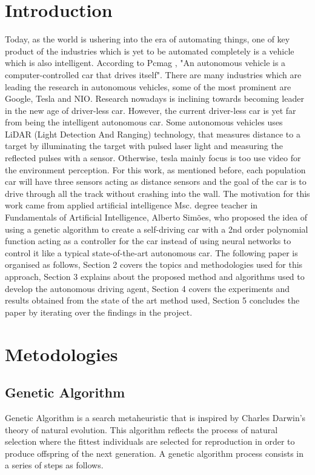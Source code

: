 \documentclass[conference]{IEEEtran}
\begin{document}
\section{Introduction}
Today, as the world is ushering into the era of automating things, one of key product of the industries which is yet
to be automated completely is a vehicle which is also intelligent. According to Pcmag \cite{pcmag_unknown}, "An autonomous vehicle is a
computer-controlled car that drives itself". There are many industries which are leading the research in autonomous
vehicles, some of the most prominent are Google, Tesla and NIO. Research nowadays is inclining towards becoming leader
in the new age of driver-less car. However, the current driver-less car is yet far from being the intelligent autonomous
car. Some autonomous vehicles uses LiDAR (Light Detection And Ranging) technology, that measures distance to a
target by illuminating the target with pulsed laser light and measuring the reflected pulses with a sensor. Otherwise, tesla mainly focus is
too use video for the environment perception. For this work, as mentioned before, each population car will have three sensors acting as distance
sensors and the goal of the car is to drive through all the track without crashing into the wall.
The motivation for this work came from applied artificial intelligence Msc. degree teacher in Fundamentals of Artificial Intelligence,
Alberto Simões, who proposed the idea of using a genetic algorithm to create a self-driving car with a 2nd order polynomial function
acting as a controller for the car instead of using neural networks to control it like a typical state-of-the-art autonomous car.
The following paper is organised as follows, Section 2 covers the topics and methodologies used for this approach, Section 3 explains about the proposed
method and algorithms used to develop the autonomous driving agent, Section 4 covers the experiments and results obtained from the
state of the art method used, Section 5 concludes the paper by iterating over the findings in the project.

\section{Metodologies}
\subsection{Genetic Algorithm}
Genetic Algorithm is a search metaheuristic that is inspired by Charles Darwin’s theory of natural evolution.
This algorithm reflects the process of natural selection where the fittest individuals are selected for reproduction
in order to produce offspring of the next generation. A genetic algorithm process consists in a series of steps as follows.
\end{document}
